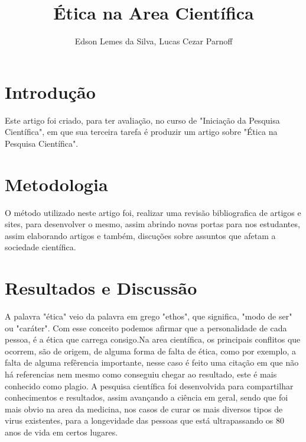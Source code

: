 \documentclass[12pt]{article}
\title{Ética na Area Cientí­fica}
\author{Edson Lemes da Silva, Lucas Cezar Parnoff}
\begin{document}
 

\maketitle

\begin{abstract}
  
\end{abstract}
     
\begin{resumo} 
  
\end{resumo}


\section{Introdução}\label{sec:introducao}
Este artigo foi criado, para ter avaliação,
no curso de "Iniciação da Pesquisa Científica",
em que sua terceira tarefa é produzir um artigo
sobre "Ética na Pesquisa Científica".
\section{Metodologia} \label{sec:desenvolv}
O método utilizado neste artigo foi, realizar uma 
revisão bibliografica de artigos e sites, 
para desenvolver o mesmo, assim abrindo novas portas
para nos estudantes, assim elaborando artigos e
também, discuções sobre assuntos que afetam a sociedade
científica.  
\section{Resultados e Discussão}\label{sec:resuldisc}
A palavra "ética" veio da palavra em grego "ethos", que
significa, "modo de ser" ou "caráter"\cite{signi:etmo}.
Com esse conceito podemos afirmar que a personalidade de
cada pessoa, é a ética que carrega consigo.Na area
científica, os principais conflitos que ocorrem, são
de origem, de alguma forma de falta de ética, como por 
exemplo, a falta de alguma refêrencia importante, nesse 
caso é feito uma citação em que não há referencias nem 
mesmo como conseguiu chegar ao resultado, este é mais 
conhecido como plagio.
A pesquisa científica foi desenvolvida para compartilhar 
conhecimentos e resultados, assim avançando a ciência em
geral, sendo que foi mais obvio na area da medicina,
nos casos de curar os mais diversos tipos de virus 
existentes, para a longevidade das pessoas que está
ultrapassando os 80 anos de vida em certos lugares.

 



\end{document}

